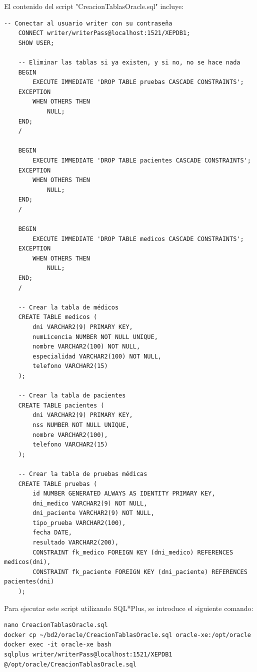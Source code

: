 \documentclass{article}
\begin{document}
El contenido del script "CreacionTablasOracle.sql" incluye:

\begin{lstlisting}[style=bashStyle]
    -- Conectar al usuario writer con su contraseña
    CONNECT writer/writerPass@localhost:1521/XEPDB1;
    SHOW USER;
    
    -- Eliminar las tablas si ya existen, y si no, no se hace nada
    BEGIN
        EXECUTE IMMEDIATE 'DROP TABLE pruebas CASCADE CONSTRAINTS';
    EXCEPTION
        WHEN OTHERS THEN
            NULL;  
    END;
    /
    
    BEGIN
        EXECUTE IMMEDIATE 'DROP TABLE pacientes CASCADE CONSTRAINTS';
    EXCEPTION
        WHEN OTHERS THEN
            NULL; 
    END;
    /
    
    BEGIN
        EXECUTE IMMEDIATE 'DROP TABLE medicos CASCADE CONSTRAINTS';
    EXCEPTION
        WHEN OTHERS THEN
            NULL;  
    END;
    /
    
    -- Crear la tabla de médicos
    CREATE TABLE medicos (
        dni VARCHAR2(9) PRIMARY KEY,
        numLicencia NUMBER NOT NULL UNIQUE,
        nombre VARCHAR2(100) NOT NULL,
        especialidad VARCHAR2(100) NOT NULL,
        telefono VARCHAR2(15)
    );
    
    -- Crear la tabla de pacientes
    CREATE TABLE pacientes (
        dni VARCHAR2(9) PRIMARY KEY,
        nss NUMBER NOT NULL UNIQUE,
        nombre VARCHAR2(100),
        telefono VARCHAR2(15)
    );
    
    -- Crear la tabla de pruebas médicas
    CREATE TABLE pruebas (
        id NUMBER GENERATED ALWAYS AS IDENTITY PRIMARY KEY,
        dni_medico VARCHAR2(9) NOT NULL,
        dni_paciente VARCHAR2(9) NOT NULL,
        tipo_prueba VARCHAR2(100),
        fecha DATE,
        resultado VARCHAR2(200),
        CONSTRAINT fk_medico FOREIGN KEY (dni_medico) REFERENCES medicos(dni),
        CONSTRAINT fk_paciente FOREIGN KEY (dni_paciente) REFERENCES pacientes(dni)
    );
\end{lstlisting}

Para ejecutar este script utilizando SQL*Plus, se introduce el siguiente comando:

\begin{lstlisting}[style=bashStyle]
nano CreacionTablasOracle.sql
docker cp ~/bd2/oracle/CreacionTablasOracle.sql oracle-xe:/opt/oracle
docker exec -it oracle-xe bash
sqlplus writer/writerPass@localhost:1521/XEPDB1
@/opt/oracle/CreacionTablasOracle.sql
\end{lstlisting}
\end{document}
